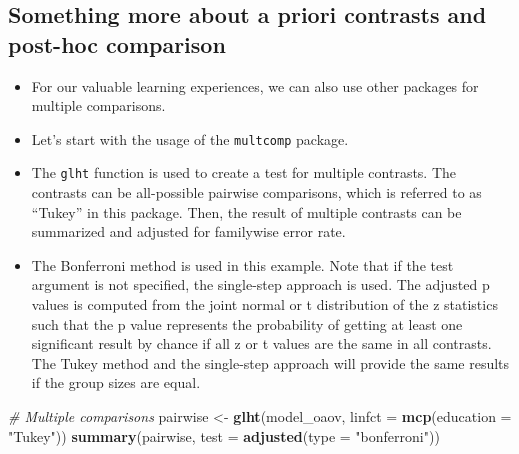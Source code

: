 \documentclass[
]{book}
\newenvironment{Shaded}{\begin{snugshade}}{\end{snugshade}}
\newcommand{\AttributeTok}[1]{\textcolor[rgb]{0.13,0.29,0.53}{#1}}
\newcommand{\CommentTok}[1]{\textcolor[rgb]{0.56,0.35,0.01}{\textit{#1}}}
\newcommand{\FunctionTok}[1]{\textcolor[rgb]{0.13,0.29,0.53}{\textbf{#1}}}
\newcommand{\NormalTok}[1]{#1}
\newcommand{\OtherTok}[1]{\textcolor[rgb]{0.56,0.35,0.01}{#1}}
\newcommand{\StringTok}[1]{\textcolor[rgb]{0.31,0.60,0.02}{#1}}
\begin{document}
\subsection{Something more about a priori contrasts and post-hoc comparison}\label{something-more-about-a-priori-contrasts-and-post-hoc-comparison}

\begin{itemize}
\item
  For our valuable learning experiences, we can also use other packages for multiple comparisons.
\item
  Let's start with the usage of the \texttt{multcomp} package.
\item
  The \texttt{glht} function is used to create a test for multiple contrasts. The contrasts can be all-possible pairwise comparisons, which is referred to as ``Tukey'' in this package. Then, the result of multiple contrasts can be summarized and adjusted for familywise error rate.
\item
  The Bonferroni method is used in this example. Note that if the test argument is not specified, the single-step approach is used. The adjusted p values is computed from the joint normal or t distribution of the z statistics such that the p value represents the probability of getting at least one significant result by chance if all z or t values are the same in all contrasts. The Tukey method and the single-step approach will provide the same results if the group sizes are equal.
\end{itemize}

\begin{Shaded}
\begin{Highlighting}[]
\CommentTok{\# Multiple comparisons}
\NormalTok{pairwise }\OtherTok{\textless{}{-}} \FunctionTok{glht}\NormalTok{(model\_oaov, }\AttributeTok{linfct =} \FunctionTok{mcp}\NormalTok{(}\AttributeTok{education =} \StringTok{"Tukey"}\NormalTok{))}
\FunctionTok{summary}\NormalTok{(pairwise, }\AttributeTok{test =} \FunctionTok{adjusted}\NormalTok{(}\AttributeTok{type =} \StringTok{"bonferroni"}\NormalTok{))}
\end{Highlighting}
\end{Shaded}
\end{document}
